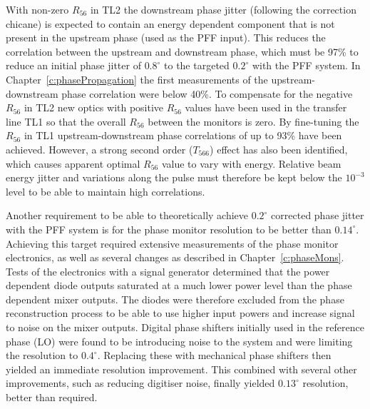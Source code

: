 With non-zero \(R_{56}\) in TL2 the downstream phase jitter (following the correction chicane) is expected to contain an energy dependent component that is not present in the upstream phase (used as the PFF input). This reduces the correlation between the upstream and downstream phase, which must be 97\% to reduce an initial phase jitter of \(0.8^\circ\) to the targeted \(0.2^\circ\) with the PFF system. In Chapter~\ref{c:phasePropagation} the first measurements of the upstream-downstream phase correlation were below 40\%. To compensate for the negative \(R_{56}\) in TL2 new optics with positive \(R_{56}\) values have been used in the transfer line TL1 so that the overall \(R_{56}\) between the monitors is zero. By fine-tuning the \(R_{56}\) in TL1 upstream-downstream phase correlations of up to 93\% have been achieved. However, a strong second order (\(T_{566}\)) effect has also been identified, which causes apparent optimal \(R_{56}\) value to vary with energy. Relative beam energy jitter and variations along the pulse must therefore be kept below the \(10^{-3}\) level to be able to maintain high correlations. 

Another requirement to be able to theoretically achieve \(0.2^\circ\) corrected phase jitter with the PFF system is for the phase monitor resolution to be better than \(0.14^\circ\). Achieving this target required extensive measurements of the phase monitor electronics, as well as several changes as described in Chapter~\ref{c:phaseMons}. Tests of the electronics with a signal generator determined that the power dependent diode outputs saturated at a much lower power level than the phase dependent mixer outputs. The diodes were therefore excluded from the phase reconstruction process to be able to use higher input powers and increase signal to noise on the mixer outputs. Digital phase shifters initially used in the reference phase (LO) were found to be introducing noise to the system and were limiting the resolution to \(0.4^\circ\). Replacing these with mechanical phase shifters then yielded an immediate resolution improvement. This combined with several other improvements, such as reducing digitiser noise, finally yielded \(0.13^\circ\) resolution, better than required.

